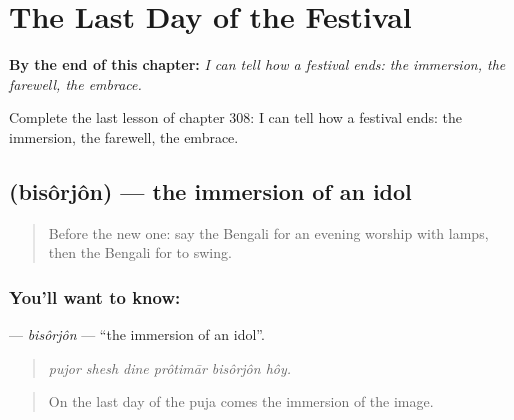 
\chapter{The Last Day of the Festival}
\label{ch:bn-the-last-day-of-the-festival}

\begin{chapteropening}
\textbf{By the end of this chapter:} \emph{I can tell how a festival ends: the immersion, the farewell, the embrace.}

Complete the last lesson of chapter 308: I can tell how a festival ends: the immersion, the farewell, the embrace.
\end{chapteropening}

\section[\texorpdfstring{\bn{বিসর্জন} (bisôrjôn)}{বিসর্জন (bisôrjôn)}]{ (bisôrjôn) — the immersion of an idol}

\label{lesson:BN-C308-bisorjon}



\begin{quote}
Before the new one: say the Bengali for an evening worship with lamps, then the Bengali for to swing.
\end{quote}

\subsection*{You'll want to know: }
\textbf{} — \emph{bisôrjôn} — \textquotedblleft{}the immersion of an idol\textquotedblright{}.

\begin{quote}
     
\end{quote}

\begin{quote}
\emph{pujor shesh dine prôtimār bisôrjôn hôy.}
\end{quote}

\begin{quote}
On the last day of the puja comes the immersion of the image.
\end{quote}

